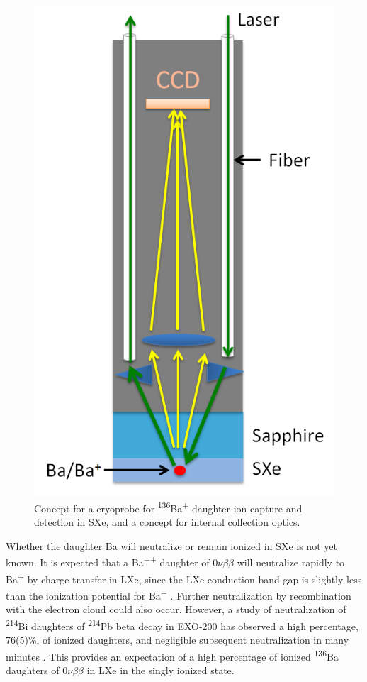 \begin{figure} %
	\centering
	\includegraphics[width=.5\textwidth]{figures/probe_flat.png}
	\caption{Concept for a cryoprobe for \textsuperscript{136}Ba\textsuperscript{+} daughter ion capture and detection in SXe, and a concept for internal collection optics.}
\label{fig:probe}
\end{figure}

Whether the daughter Ba will neutralize or remain ionized in SXe is not yet known.  It is expected that a Ba\textsuperscript{++} daughter of $0\nu\beta\beta$ will neutralize rapidly to Ba\textsuperscript{+} by charge transfer in LXe, since the LXe conduction band gap is slightly less than the ionization potential for Ba\textsuperscript{+} \cite{Moe1991}.  Further neutralization by recombination with the electron cloud could also occur.  However, a study of neutralization of \textsuperscript{214}Bi daughters of \textsuperscript{214}Pb beta decay in EXO-200 has observed a high percentage, 76(5)\%, of ionized daughters, and negligible subsequent neutralization in many minutes \cite{alphaion}.  This provides an expectation of a high percentage of ionized \textsuperscript{136}Ba daughters of $0\nu\beta\beta$ in LXe in the singly ionized state.

